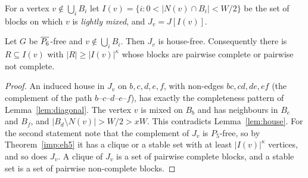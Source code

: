 For a vertex $v\notin\bigcup_iB_i$ let $I(v)=\{i:0<|N(v)\cap B_i|<W/2\}$ be the set of blocks on which $v$
is \emph{lightly mixed}, and $J_v=J[I(v)]$.

\begin{corollary}\label{cor:housefree}
Let $G$ be $\overline{P_6}$-free and $v\notin\bigcup_iB_i$. Then $J_v$ is house-free. Consequently there is
$R\subseteq I(v)$ with $|R|\ge|I(v)|^{\kappa}$ whose blocks are pairwise complete or pairwise not complete.
\end{corollary}
\begin{proof}
An induced house in $J_v$ on $b,c,d,e,f$, with non-edges $bc,cd,de,ef$ (the complement of the path
$b$--$c$--$d$--$e$--$f$), has exactly the completeness pattern of Lemma~\ref{lem:diagonal}. The vertex $v$ is
mixed on $B_b$ and has neighbours in $B_e$ and $B_f$, and $|B_d\setminus N(v)|>W/2>xW$. This contradicts
Lemma~\ref{lem:house}. For the second statement note that the complement of $J_v$ is $P_5$-free, so by
Theorem~\ref{imp:eh5} it has a clique or a stable set with at least $|I(v)|^\kappa$ vertices, and so does
$J_v$. A clique of $J_v$ is a set of pairwise complete blocks, and a stable set is a set of pairwise
non-complete blocks.
\end{proof}
